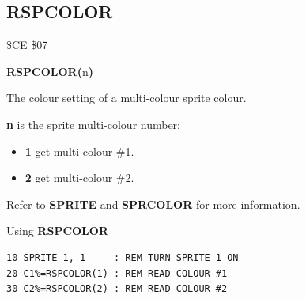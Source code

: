 \subsection{RSPCOLOR}
\begin{description}[leftmargin=2cm,style=nextline]
\item [Token:]    \$CE \$07

\item [Format:]   {\bf RSPCOLOR(}n{\bf)}

\item [Returns:]  The colour setting of a multi-colour sprite colour.

                  {\bf n} is the sprite multi-colour number:

                  \begin{itemize}
                     \item {\bf 1} get multi-colour \#1.
                     \item {\bf 2} get multi-colour \#2.
                  \end{itemize}

\item [Remarks:]  Refer to {\bf SPRITE} and {\bf SPRCOLOR} for more information.

\item [Example:]  Using {\bf RSPCOLOR}

\begin{tcolorbox}[colback=black,coltext=white]
\verbatimfont{\codefont}
\begin{verbatim}
10 SPRITE 1, 1     : REM TURN SPRITE 1 ON
20 C1%=RSPCOLOR(1) : REM READ COLOUR #1
30 C2%=RSPCOLOR(2) : REM READ COLOUR #2
\end{verbatim}
\end{tcolorbox}
\end{description}


\newpage
